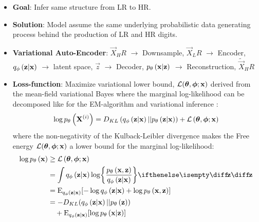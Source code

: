 \begin{itemize}
	\item \textbf{Goal}: Infer same structure from LR to HR. 
	\item \textbf{Solution}: Model assume the same underlying probabilistic data generating process behind the production of LR and HR digits.
	\item \textbf{Variational Auto-Encoder}: $\vec{X}_HR$ $\rightarrow$ Downsample, $\vec{X}_LR$ $\rightarrow$  Encoder, $q_{\phi}\left(\bm{\mathrm{z}}|\bm{\mathrm{x}}\right)$ $\rightarrow$ latent space, $\vec{z}$ $\rightarrow$ Decoder, $p_{\theta}\left(\bm{\mathrm{x}}|\bm{\mathrm{z}}\right)$ $\rightarrow$ Reconstruction, $\tilde{\vec{X}}_HR$
	\item \textbf{Loss-function}: Maximize variational lower bound, $\mathcal{L}(\bm{\mathrm{\theta}},\bm{\mathrm{\phi}};\bm{\mathrm{x}})$ derived from the mean-field variational Bayes where the marginal log-likelihood can be decomposed like for the EM-algorithm and variational inference \cite[\S10.2]{Bishop2006}:
	\begin{equation}
		\log p_{\theta}\left(\bm{\mathrm{X}}^{(i)}\right) = D_{KL}\left( q_{\phi}\left(\bm{\mathrm{z}}|\bm{\mathrm{x}}\right)||p_{\theta}\left(\bm{\mathrm{z}}|\bm{\mathrm{x}}\right)\right) + \mathcal{L}\left(\bm{\mathrm{\theta}},\bm{\mathrm{\phi}};\bm{\mathrm{x}}\right)
	\end{equation} 
	where the non-negativity of the Kulback-Leibler divergence makes the Free energy $\mathcal{L}(\bm{\mathrm{\theta}},\bm{\mathrm{\phi}};\bm{\mathrm{x}})$ a lower bound for the marginal log-likelihood:
	\begin{gather}
	\begin{split}
		\log \dec{\vec{x}} & \ge \mathcal{L}\left(\vec{\theta},\vec{\phi};\vec{x}\right)
		\\ & =
		\int \enc{\vec{z}|\vec{x}} \log \curlies*{ \frac{\dec{\vec{x},\vec{z}}}{\enc{\vec{z}|\vec{x}} } } \D{\vec{z}} \\ 
		& = \E_{\enc{\vec{z}|\vec{x}}} \brackets{- \log \enc{\vec{z}|\vec{x}} + \log \dec{\vec{x},\vec{z}} } 
		\\
		& = -D_{KL}\parens{ \enc{\vec{z}|\vec{x}}||\dec{\vec{z}} } 
		\\ 
		& \quad+ \E_{\enc{\vec{z}|\vec{x}}} \brackets{\log \dec{\vec{x}|\vec{z}} }   	
	\end{split} 
\end{gather}
\end{itemize}

